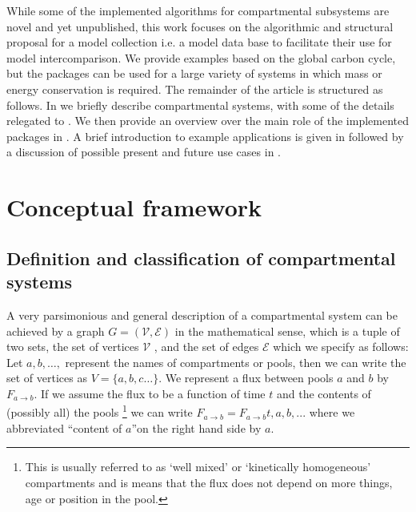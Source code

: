 
While some of the implemented algorithms for compartmental subsystems are novel 
and yet unpublished, this work focuses on the algorithmic and structural proposal for a model collection
i.e. a model data base to facilitate their use for model intercomparison. 
We provide examples based on the global carbon cycle, but the
packages can be used for a large variety of systems in which mass or energy
conservation is required.
The remainder of the article is structured as follows.
In  we briefly describe compartmental systems, with some of the details
relegated to .
We then provide an overview over the main role of the implemented packages in 
. A brief introduction to example applications
is given in  followed by a discussion of
possible present and future use cases in
. 



\section{Conceptual framework}
\label{sec:ConceptualFramework}
\subsection{Definition and classification of compartmental systems} 


A very parsimonious and general description of a compartmental system can be achieved by a graph $G=(\mathcal{V}, \mathcal{E})$ in
the mathematical sense, which is a tuple of two sets, the set of vertices $\mathcal{V}$ , and the
set of edges $\mathcal{E}$ which we specify as follows: 
Let $a,b,\dots,$ represent the names of compartments or pools, then we can write the set of vertices as $V=\{a,b,c\dots\}$. We represent a flux between pools $a$ and $b$ by $F_{a\rightarrow b}$.
If we assume the flux to be a function of time $t$ and the contents of (possibly all) the pools \footnote{
This is usually referred to as `well mixed' or
`kinetically homogeneous' compartments and is means that the flux does not depend on more things, \eg age or position in the pool.
}
we can write $F_{a\rightarrow b}=F_{a\rightarrow b}{t,a,b,...}$   
where we abbreviated ``content of $a$''on the right hand side by $a$.

